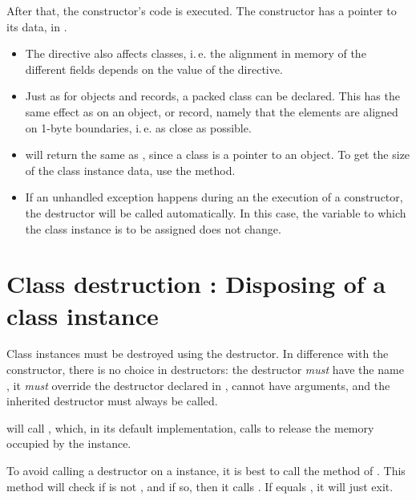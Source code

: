 After that, the constructor's code is executed.
The constructor has a pointer to its data, in .

\begin{remark}
\begin{itemize}
\item The  directive also affects classes,
i.\,e. the alignment in memory of the different fields depends on the
value of  the  directive.
\item Just as for objects and records, a packed class can be declared.
This has the same effect as on an object, or record, namely that the
elements are aligned on 1-byte boundaries, i.\,e. as close as possible.
\item {} will return the same as ,
since a class is a pointer to an object. To get the size of the class
instance data, use the  method.
\item If an unhandled exception happens during an the execution of a
constructor, the destructor will be called automatically. In this case,
the variable to which the class instance is to be assigned does not change.
\end{itemize}
\end{remark}



\section{Class destruction : Disposing of a class instance}
Class instances must be destroyed using the destructor. In difference with
the constructor, there is no choice in destructors: the destructor {\em must}
have the name , it {\em must}  override the  destructor
declared in , cannot have arguments, and the inherited destructor
must always be called.

 will call , which, in its default implementation,
calls  to release the memory occupied by the instance.

To avoid calling a destructor on a  instance, it is best to call
the  method of . This method will check if  is not ,
and if so, then it calls . If  equals , it
will just exit.

